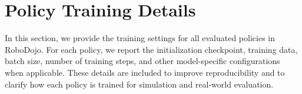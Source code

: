

\section{Policy Training Details}
\label{appendix:train_details}

In this section, we provide the training settings for all evaluated policies in RoboDojo. For each policy, we report the initialization checkpoint, training data, batch size, number of training steps, and other model-specific configurations when applicable. These details are included to improve reproducibility and to clarify how each policy is trained for simulation and real-world evaluation.





% 

